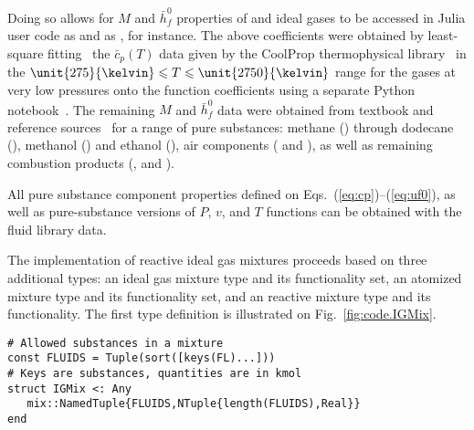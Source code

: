     Doing so allows for $M$ and $\bar{h}_f^0$ properties of  and  ideal gases to be accessed in Julia user code as  and as , for  instance.  The
    above    coefficients  were  obtained  by  least-square  fitting~\cite{2007-PressWH+FlanneryBP-Cambridge}  the  $\bar{c}_p(T)$  data  given  by   the   CoolProp   thermophysical
    library~\cite{2014-BellIH+VincentL-IndEngChemR} in the $\unit{275}{\kelvin} \leqslant T \leqslant \unit{2750}{\kelvin}$ range for the gases at  very  low  pressures  onto  the  
    function coefficients using a separate Python~\cite{1995-vanRossumG-CWI} notebook~\cite{2019-Jupyter-www}. The remaining  $M$  and  $\bar{h}_f^0$  data  were  obtained  from  textbook  and
    reference sources~\cite{2013-CengelYA+BolesMA-AMGH, 1985-WylenG-Wiley, 2006-LideDR-CRC} for a range  of  pure  substances:  methane  ()  through  dodecane  (),  methanol
    () and ethanol (), air components ( and ), as well as remaining combustion products (, and ).

    All pure substance component properties defined on Eqs.~(\ref{eq:cp})--(\ref{eq:uf0}), as well as pure-substance versions of $P$, $v$, and $T$ functions can be obtained with the  
    fluid library data.

    The implementation of reactive ideal gas mixtures proceeds based on three additional types: an  ideal gas mixture type and  its  functionality  set,  an    atomized
    mixture type and its functionality set, and an  reactive mixture type and its functionality. The first type definition is illustrated on Fig.~\ref{fig:code.IGMix}.

    \begin{figure*}[h]
        \centering
        \begin{lstlisting}
# Allowed substances in a mixture
const FLUIDS = Tuple(sort([keys(FL)...]))
# Keys are substances, quantities are in kmol
struct IGMix <: Any
   mix::NamedTuple{FLUIDS,NTuple{length(FLUIDS),Real}}
end
        \end{lstlisting}
        \caption{Listing for the  structure code snippet.  data member, , is a named tuple of each gas's chemical amount in the represented mixture.}
        \label{fig:code.IGMix}
    \end{figure*}



